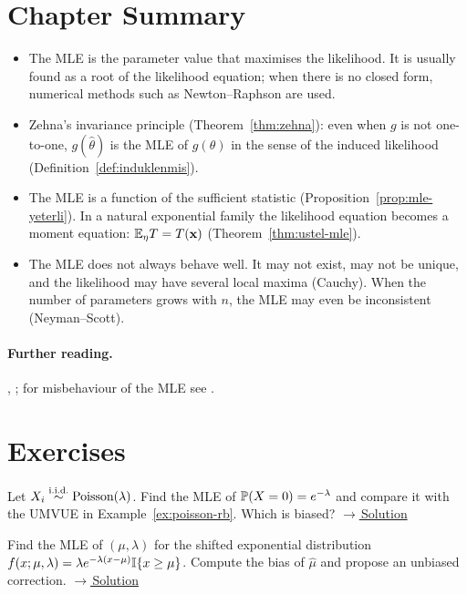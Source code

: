 \documentclass[main.tex]{subfiles}
\begin{document}
\section{Chapter Summary}
\begin{summary}
\begin{itemize}
  \item The MLE is the parameter value that maximises the likelihood. It is usually found as a root of the likelihood equation; when there is no closed form, numerical methods such as Newton--Raphson are used.
  \item Zehna's invariance principle (Theorem~\ref{thm:zehna}): even when $g$ is not one-to-one, $g(\hat\theta)$ is the MLE of $g(\theta)$ in the sense of the induced likelihood (Definition~\ref{def:induklenmis}).
  \item The MLE is a function of the sufficient statistic (Proposition~\ref{prop:mle-yeterli}). In a natural exponential family the likelihood equation becomes a moment equation: $\E_\eta T=T(\x)$ (Theorem~\ref{thm:ustel-mle}).
  \item The MLE does not always behave well. It may not exist, may not be unique, and the likelihood may have several local maxima (Cauchy). When the number of parameters grows with $n$, the MLE may even be inconsistent (Neyman--Scott).
\end{itemize}
\end{summary}

\paragraph{Further reading.} \cite[Section~7.2]{casella}, \cite[Chapter~9]{wasserman}; for misbehaviour of the MLE see \cite[Chapter~6]{lehmann-casella}.

\section{Exercises}

\begin{exercise}\label{exr:11-1}
Let $X_i\iid\text{Poisson}(\lambda)$. Find the MLE of $\P(X=0)=e^{-\lambda}$ and compare it with the UMVUE in Example~\ref{ex:poisson-rb}. Which is biased?
\hfill\hyperref[coz:11-1]{\footnotesize$\rightarrow$\,Solution}
\end{exercise}

\begin{exercise}\label{exr:11-2}
Find the MLE of $(\mu,\lambda)$ for the shifted exponential distribution $f(x;\mu,\lambda)=\lambda e^{-\lambda(x-\mu)}\I\{x\ge\mu\}$. Compute the bias of $\hat\mu$ and propose an unbiased correction.
\hfill\hyperref[coz:11-2]{\footnotesize$\rightarrow$\,Solution}
\end{exercise}
\end{document}
